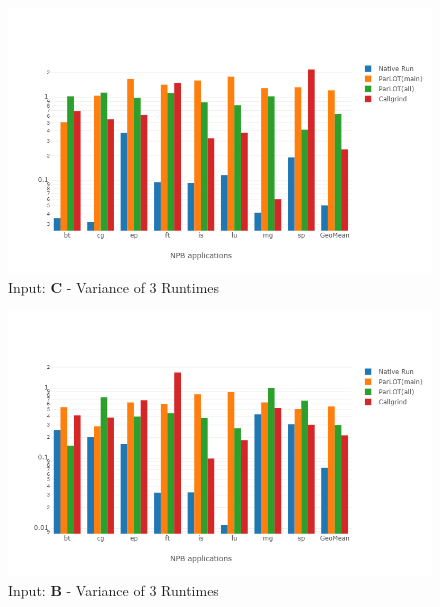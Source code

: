 \begin{figure}[!t]
\centering
\includegraphics[width=6in]{figs.comet/comet_chartAvg_var_C_p3_5.png}
\caption{ Input: \textbf{C}  - Variance of 3 Runtimes
}
\label{comet_chartAvg_var_C_p3_5}
\end{figure}



\begin{figure}[!t]
\centering
\includegraphics[width=6in]{figs.comet/comet_chartAvg_var_B_p3_5.png}
\caption{ Input: \textbf{B}  - Variance of 3 Runtimes
}
\label{comet_chartAvg_var_B_p3_5}
\end{figure}









